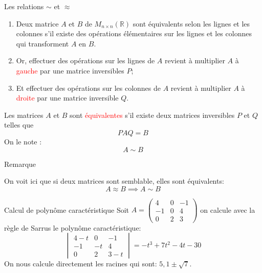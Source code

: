 \begin{parag}{Les relations $\sim$ et $\approx$}

    \begin{enumerate}
        \item Deux matrice $A$ et $B$ de $M_{n \times n}(\mathbb{R})$ sont équivalents selon les lignes et les colonnes s'il existe des opérations élémentaires sur les lignes et les colonnes qui transforment $A$ en $B$.
        \item Or, effectuer des opérations sur les lignes de $A$ revient à multiplier $A$ à \textcolor{red}{gauche} par une matrice inversibles $P$;
        \item Et effectuer des opérations sur les colonnes de $A$ revient à multiplier $A$ à \textcolor{red}{droite} par une matrice inversible $Q$.
    \end{enumerate}
    \begin{definition}
        Les matrices $A$ et $B$ sont \textcolor{red}{équivalentes} s'il existe deux matrices inversibles $P$ et $Q$ telles que 
        \[PAQ = B\]
        On le note :
        \[A \sim B\]
    \end{definition}
    \begin{subparag}{Remarque}
        \begin{framedremark}
            On voit ici que si deux matrices sont semblable, elles sont équivalents:
            \[A \approx B \implies A \sim B\]
        \end{framedremark}
    \end{subparag}
\end{parag}
\begin{parag}{Calcul de polynôme caractéristique}
    Soit $A = \begin{pmatrix}
        4 & 0 & -1\\
        -1 & 0 & 4 \\
        0 & 2 & 3
    \end{pmatrix}$ on calcule avec la règle de Sarrus le polynôme caractéristique:
\[\begin{vmatrix}
    4-t & 0 & -1\\
    -1 &-t & 4\\
    0 & 2 & 3-t
\end{vmatrix} = -t^3 + 7t^2 -4t -30\]
On nous calcule directement les racines qui sont: $5, 1 \pm \sqrt{7}$.
\end{parag}


